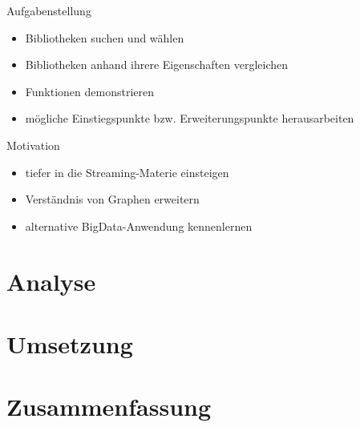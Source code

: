 \documentclass[a4paper, fontsize=11pt]{beamer}
\begin{document}
\begin{frame}{Aufgabenstellung}
\begin{itemize}
\item Bibliotheken suchen und wählen
\item Bibliotheken anhand ihrere Eigenschaften vergleichen
\item Funktionen demonstrieren
\item mögliche Einstiegspunkte bzw. Erweiterungspunkte herausarbeiten
\end{itemize}
\end{frame}

\begin{frame}{Motivation}
\begin{itemize}
\item tiefer in die Streaming-Materie einsteigen
\item Verständnis von Graphen erweitern
\item alternative BigData-Anwendung kennenlernen
\end{itemize}
\end{frame}

\section{Analyse}
\section{Umsetzung}
\section{Zusammenfassung}
\end{document}

